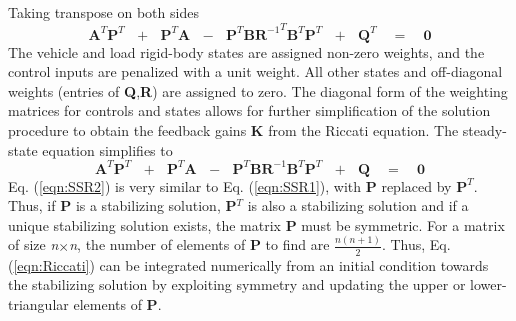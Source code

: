 Taking transpose on both sides
\begin{equation*}
\textbf{A}^T \textbf{P}^T \textrm{ }+ \textrm{ }\textbf{P}^T \textbf{A} \textrm{ }- \textrm{ }\textbf{P}^T \textbf{B}{\textbf{R}^{-1}}^T\textbf{B}^T \textbf{P}^T \textrm{ }+ \textrm{ }\textbf{Q}^T \quad = \quad \textbf{0}
\end{equation*}
The vehicle and load rigid-body states are assigned non-zero weights, and the control inputs are penalized with a unit weight. All other states and off-diagonal weights (entries of \textbf{Q},\textbf{R}) are assigned to zero. The diagonal form of the weighting matrices for controls and states allows for further simplification of the solution procedure to obtain the feedback gains \textbf{K} from the Riccati equation. The steady-state equation simplifies to
\begin{equation}
\label{eqn:SSR2}
\textbf{A}^T \textbf{P}^T \textrm{ }+ \textrm{ }\textbf{P}^T \textbf{A} \textrm{ }- \textrm{ }\textbf{P}^T \textbf{B}{\textbf{R}^{-1}}\textbf{B}^T \textbf{P}^T \textrm{ }+ \textrm{ }\textbf{Q} \quad =\quad \textbf{0}
\end{equation}
Eq. (\ref{eqn:SSR2}) is very similar to Eq. (\ref{eqn:SSR1}), with \textbf{P} replaced by $\textbf{P}^T$. Thus, if \textbf{P} is a stabilizing solution, \textbf{P}$^T$ is also a stabilizing solution and if a unique stabilizing solution exists, the matrix \textbf{P} must be symmetric. For a matrix of size \emph{n}$\times$\emph{n}, the number of elements of \textbf{P} to find are ${\frac{n \left(n+1\right)}{2}}$. Thus, Eq. (\ref{eqn:Riccati}) can be integrated numerically from an initial condition towards the stabilizing solution by exploiting symmetry and updating the upper or lower-triangular elements of \textbf{P}.

